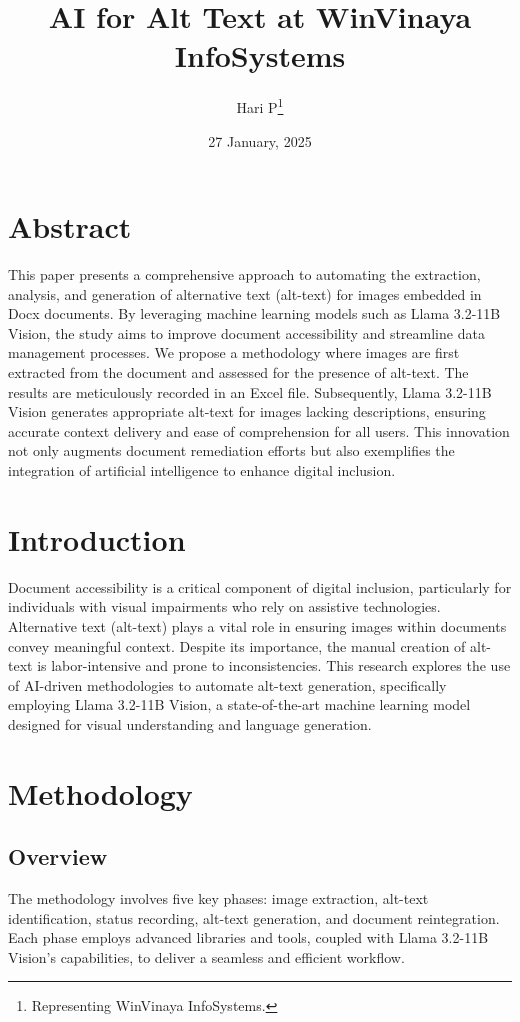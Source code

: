 \documentclass[12pt]{article}
\title{AI for Alt Text at WinVinaya InfoSystems}
\author{Hari P\thanks{Representing WinVinaya InfoSystems.}}
\date{27 January, 2025}
\begin{document}
 
\maketitle 
\clearpage 

\tableofcontents
\clearpage 

\section{Abstract}
This paper presents a comprehensive approach to automating the extraction, analysis, and generation of alternative text (alt-text) for images embedded in Docx documents. By leveraging machine learning models such as Llama 3.2-11B Vision, the study aims to improve document accessibility and streamline data management processes. We propose a methodology where images are first extracted from the document and assessed for the presence of alt-text. The results are meticulously recorded in an Excel file. Subsequently, Llama 3.2-11B Vision generates appropriate alt-text for images lacking descriptions, ensuring accurate context delivery and ease of comprehension for all users. This innovation not only augments document remediation efforts but also exemplifies the integration of artificial intelligence to enhance digital inclusion. 

\section{Introduction}
Document accessibility is a critical component of digital inclusion, particularly for individuals with visual impairments who rely on assistive technologies. Alternative text (alt-text) plays a vital role in ensuring images within documents convey meaningful context. Despite its importance, the manual creation of alt-text is labor-intensive and prone to inconsistencies. This research explores the use of AI-driven methodologies to automate alt-text generation, specifically employing Llama 3.2-11B Vision, a state-of-the-art machine learning model designed for visual understanding and language generation.

\section{Methodology}
\subsection{Overview}
The methodology involves five key phases: image extraction, alt-text identification, status recording, alt-text generation, and document reintegration. Each phase employs advanced libraries and tools, coupled with Llama 3.2-11B Vision’s capabilities, to deliver a seamless and efficient workflow.
\end{document}
